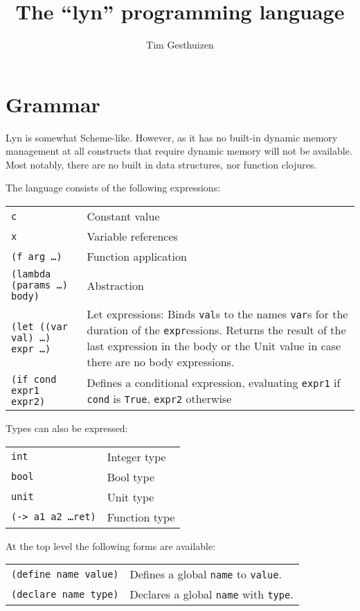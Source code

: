 \documentclass[a4paper, 11pt]{article}
\title{The ``lyn'' programming language}
\author{Tim Gesthuizen}
\begin{document}
\maketitle

\section{Grammar}

Lyn is somewhat Scheme-like.
However, as it has no built-in dynamic memory management at all
constructs that require dynamic memory will not be available.
Most notably, there are no built in data structures, nor function
clojures.

The language consists of the following expressions:\\[1.5ex]
\begin{tabularx}{\linewidth}{lX}
  \texttt{c} & Constant value\\
  \texttt{x} & Variable references\\
  \texttt{(f arg \ldots)} & Function application\\
  \texttt{(lambda (params \ldots) body)} & Abstraction\\
  \texttt{(let ((var val) \ldots) expr \ldots)} & Let expressions:
  Binds \texttt{val}s to the names \texttt{var}s for the duration of
  the \texttt{expr}essions.
  Returns the result of the last expression in the body or the Unit
  value in case there are no body expressions.\\
  \texttt{(if cond expr1 expr2)} & Defines a conditional
  expression, evaluating \texttt{expr1} if \texttt{cond} is
  \texttt{True}, \texttt{expr2} otherwise\\
\end{tabularx}

Types can also be expressed:\\[1.5ex]
\begin{tabularx}{\linewidth}{lX}
  \texttt{int}& Integer type\\
  \texttt{bool}& Bool type\\
  \texttt{unit}& Unit type\\
  \texttt{(-> a1 a2 \ldots ret)} & Function type\\
\end{tabularx}

At the top level the following forms are available:\\[1.5ex]
\begin{tabularx}{\linewidth}{lX}
  \texttt{(define name value)} & Defines a global \texttt{name} to
                                 \texttt{value}.\\
  \texttt{(declare name type)} & Declares a global \texttt{name} with
                                 \texttt{type}.\\
\end{tabularx}
\end{document}
